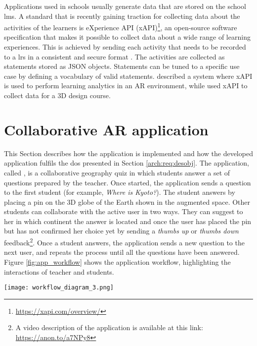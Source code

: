 Applications used in schools usually generate data that are stored on the school \gls{lms}.
A standard that is recently gaining traction for collecting data about the activities of the learners is eXperience API (xAPI)\footnote{\url{https://xapi.com/overview/}}, an open-source software specification that makes it possible to collect data about a wide range of learning experiences. This is achieved by sending each activity that needs to be recorded to a \gls{lrs} in a consistent and secure format \citep{xAPIspec}.
The activities are collected as statements stored as JSON objects.
Statements can be tuned to a specific use case by defining a vocabulary of valid statements.
\cite{9225931} described a system where xAPI is used to perform learning analytics in an AR environment, while \cite{wu2020design} used xAPI to collect data for a 3D design course.

\section{Collaborative AR application}\label{eval:appdesc}

This Section describes how the application is implemented and how the developed application fulfils the \gls{do}s presented in Section \ref{arch:req:desobj}.
The application, called \appname{}, is a collaborative geography quiz in which students answer a set of questions prepared by the teacher.
Once started, the application sends a question to the first student (for example, \textit{Where is Kyoto?}). The student answers by placing a pin on the 3D globe of the Earth shown in the augmented space.
Other students can collaborate with the active user in two ways. They can suggest to her in which continent the answer is located and \textendash{} once the user has placed the pin but has not confirmed her choice yet \textendash{} by sending a \textit{thumbs up} or \textit{thumbs down} feedback\footnote{A video description of the application is available at this link: \url{https://anon.to/a7NPy8}}.
Once a student answers, the application sends a new question to the next user, and repeats the process until all the questions have been answered.
Figure \ref{fig:app_workflow} shows the application workflow, highlighting the interactions of teacher and students.

\begin{figure*}[htbp]
    \centering
    \texttt{[image: workflow\_diagram\_3.png]}
    \caption{\fontsize{10pt}{11pt}}
    \label{fig:app_workflow}
\end{figure*}


